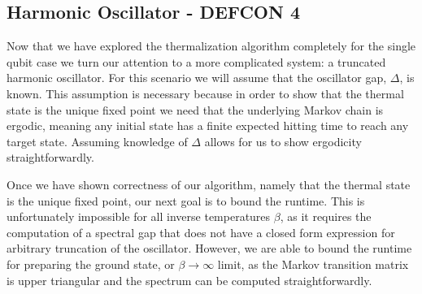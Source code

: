 \documentclass{article}
\begin{document}
\subsection{Harmonic Oscillator - DEFCON 4} \label{sec:harmonic_oscillator}
Now that we have explored the thermalization algorithm completely for the single qubit case we turn our attention to a more complicated system: a truncated harmonic oscillator. For this scenario we will assume that the oscillator gap, $\Delta$, is known. This assumption is necessary because in order to show that the thermal state is the unique fixed point we need that the underlying Markov chain is ergodic, meaning any initial state has a finite expected hitting time to reach any target state. Assuming knowledge of $\Delta$ allows for us to show ergodicity straightforwardly.

Once we have shown correctness of our algorithm, namely that the thermal state is the unique fixed point, our next goal is to bound the runtime. This is unfortunately impossible for all inverse temperatures $\beta$, as it requires the computation of a spectral gap that does not have a closed form expression for arbitrary truncation of the oscillator. However, we are able to bound the runtime for preparing the ground state, or $\beta \to \infty$ limit, as the Markov transition matrix is upper triangular and the spectrum can be computed straightforwardly.
\end{document}
